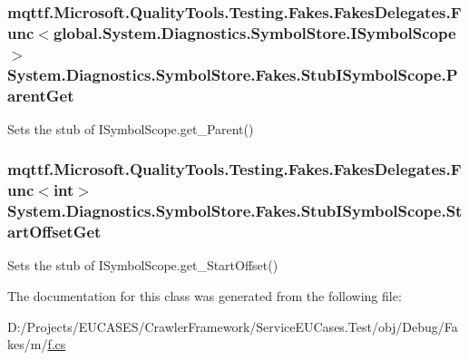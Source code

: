 \hypertarget{class_system_1_1_diagnostics_1_1_symbol_store_1_1_fakes_1_1_stub_i_symbol_scope_a16cbc4c5fcd52262b8213d42044c5962}{
\subsubsection[{Parent\-Get}]{\setlength{\rightskip}{0pt plus 5cm}mqttf.\-Microsoft.\-Quality\-Tools.\-Testing.\-Fakes.\-Fakes\-Delegates.\-Func$<$global.\-System.\-Diagnostics.\-Symbol\-Store.\-I\-Symbol\-Scope$>$ System.\-Diagnostics.\-Symbol\-Store.\-Fakes.\-Stub\-I\-Symbol\-Scope.\-Parent\-Get}}\label{class_system_1_1_diagnostics_1_1_symbol_store_1_1_fakes_1_1_stub_i_symbol_scope_a16cbc4c5fcd52262b8213d42044c5962}


Sets the stub of I\-Symbol\-Scope.\-get\-\_\-\-Parent()

\hypertarget{class_system_1_1_diagnostics_1_1_symbol_store_1_1_fakes_1_1_stub_i_symbol_scope_a6cc5e0b67f597328c12600ec4b7e2e5c}{
\subsubsection[{Start\-Offset\-Get}]{\setlength{\rightskip}{0pt plus 5cm}mqttf.\-Microsoft.\-Quality\-Tools.\-Testing.\-Fakes.\-Fakes\-Delegates.\-Func$<$int$>$ System.\-Diagnostics.\-Symbol\-Store.\-Fakes.\-Stub\-I\-Symbol\-Scope.\-Start\-Offset\-Get}}\label{class_system_1_1_diagnostics_1_1_symbol_store_1_1_fakes_1_1_stub_i_symbol_scope_a6cc5e0b67f597328c12600ec4b7e2e5c}


Sets the stub of I\-Symbol\-Scope.\-get\-\_\-\-Start\-Offset()



The documentation for this class was generated from the following file\-:\begin{DoxyCompactItemize}
\item 
D\-:/\-Projects/\-E\-U\-C\-A\-S\-E\-S/\-Crawler\-Framework/\-Service\-E\-U\-Cases.\-Test/obj/\-Debug/\-Fakes/m/\hyperlink{m_2f_8cs}{f.\-cs}\end{DoxyCompactItemize}
